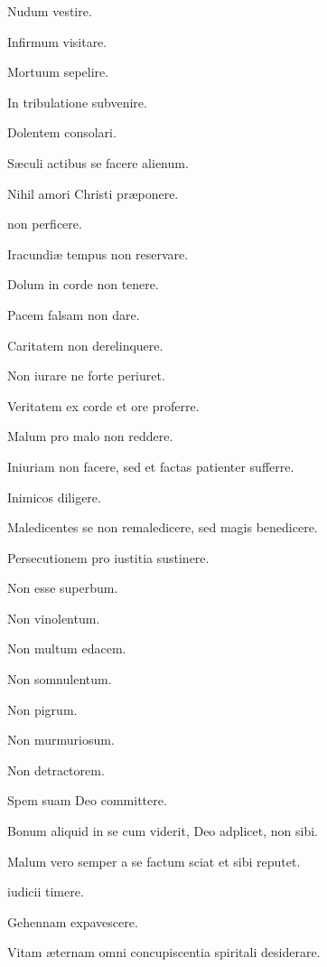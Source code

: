 \documentclass[fontsize=9pt,paper=A6,twoside,BCOR=1mm,DIV=22,headinclude]{scrarticle}
\begin{document}
\begin{multicols}{2}
\begin{psalmus}
Nudum vestire. 

Infirmum visitare. 

Mortuum sepelire.

In tribulatione subvenire.

Dolentem consolari. 

Sæculi actibus se facere alienum. 

Nihil amori Christi præponere.
\end{psalmus}

\begin{psalmus}
 non perficere.

\hspace{.00001em} Iracundiæ tempus non reservare.

Dolum in corde non tenere.

Pacem falsam non dare.

Caritatem non derelinquere.

Non iurare ne forte periuret.

Veritatem ex corde et ore proferre.

Malum pro malo non reddere.

Iniuriam non facere, sed et factas patienter sufferre.

Inimicos diligere.

Maledicentes se non remaledicere, sed magis benedicere.

Persecutionem pro iustitia sustinere.

Non esse superbum.

Non vinolentum.

Non multum edacem.

Non somnulentum.

Non pigrum.

Non murmuriosum.

Non detractorem.

Spem suam Deo committere.

Bonum aliquid in se cum viderit, Deo adplicet, non sibi.

Malum vero semper a se factum sciat et sibi reputet.
\end{psalmus}

\begin{psalmus}
 iudicii timere.

\hspace{1.1em} Gehennam expavescere.

Vitam æternam omni concupiscentia spiritali desiderare.


\end{psalmus}
\end{multicols}
\end{document}
